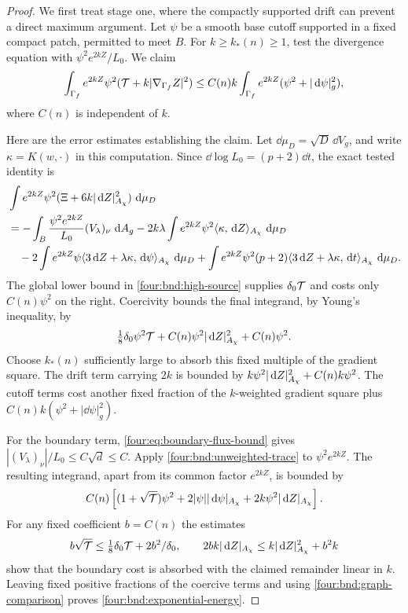 \begin{proof}
We first treat stage one, where the compactly supported drift can
prevent a direct maximum argument.  Let $\psi$ be a smooth base
cutoff supported in a fixed compact patch, permitted to meet $B$.
For $k\ge k_*(n)\ge1$, test the divergence equation with
$\psi^2e^{2kZ}/L_0$.  We claim
\begin{equation}\label{four:bnd:exponential-energy}
 \int_{\Gamma_f}e^{2kZ}\psi^2
       (\mathcal T+k|\nabla_{\Gamma_f}Z|^2)
 \le C(n)k\int_{\Gamma_f}e^{2kZ}
       (\psi^2+|\,\mathrm d\psi|_g^2),
\end{equation}
where $C(n)$ is independent of $k$.

Here are the error estimates establishing the claim.  Let
$\dd\mu_D=\sqrt D\,\dd V_g$, and write
$\kappa=K(w,\cdot)$ in this computation.  Since
$\dd\log L_0=(p+2)\dd t$, the exact tested identity is
\begin{align*}
 &\int e^{2kZ}\psi^2
      (\Xi+6k|\,\mathrm d Z|_{A_\chi}^2)\,\,\mathrm d\mu_D\\
 &=-\int_B\frac{\psi^2e^{2kZ}}{L_0}(V_\lambda)_\nu\,\,\mathrm d A_g
   -2k\lambda\int e^{2kZ}\psi^2
                   \langle\kappa,\,\mathrm d Z\rangle_{A_\chi}\,\,\mathrm d\mu_D\\
 &\quad-2\int e^{2kZ}\psi
             \langle3\,\mathrm d Z+\lambda\kappa,\,\mathrm d\psi\rangle_{A_\chi}\,\,\mathrm d\mu_D
   +\int e^{2kZ}\psi^2(p+2)
             \langle3\,\mathrm d Z+\lambda\kappa,\,\mathrm d t\rangle_{A_\chi}\,\,\mathrm d\mu_D.
\end{align*}
The global lower bound in \eqref{four:bnd:high-source} supplies
$\delta_0\mathcal T$ and costs only $C(n)\psi^2$ on the right.
Coercivity bounds the final integrand, by Young's inequality, by
\[
 \tfrac18\delta_0\psi^2\mathcal T
       +C(n)\psi^2|\,\mathrm d Z|_{A_\chi}^2+C(n)\psi^2.
\]
Choose $k_*(n)$ sufficiently large to absorb this fixed multiple of
the gradient square.  The drift term carrying $2k$ is bounded by
$k\psi^2|\,\mathrm d Z|_{A_\chi}^2+C(n)k\psi^2$.
The cutoff terms cost another fixed fraction of the $k$-weighted
gradient square plus $C(n)k(\psi^2+|\dd\psi|_g^2)$.

For the boundary term, \eqref{four:eq:boundary-flux-bound} gives
$|(V_\lambda)_\nu|/L_0\le C\sqrt d\le C$.
Apply \eqref{four:bnd:unweighted-trace} to $\psi^2e^{2kZ}$.
The resulting integrand, apart from its common factor $e^{2kZ}$,
is bounded by
\[
 C(n)\left[(1+\sqrt{\mathcal T})\psi^2
      +2|\psi||\,\mathrm d\psi|_{A_\chi}
      +2k\psi^2|\,\mathrm d Z|_{A_\chi}\right].
\]
For any fixed coefficient $b=C(n)$ the estimates
\[
 b\sqrt{\mathcal T}\le\tfrac18\delta_0\mathcal T+2b^2/\delta_0,
 \qquad
 2bk|\,\mathrm d Z|_{A_\chi}
       \le k|\,\mathrm d Z|_{A_\chi}^2+b^2k
\]
show that the boundary cost is absorbed with the claimed remainder
linear in $k$.
Leaving fixed positive fractions of the coercive terms and using
\eqref{four:bnd:graph-comparison} proves
\eqref{four:bnd:exponential-energy}.


\end{proof}
